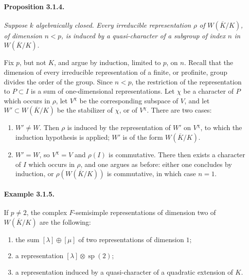 \documentclass[10pt,a4paper]{article}
\providecommand{\sprep}{\operatorname{sp}}
\begin{document}
\paragraph{Proposition 3.1.4.}{\itshape  Suppose \(k\) algebraically closed. Every irreducible representation \(\rho\) of \(W(\overline K/K)\), of dimension \(n<p\), is induced by a quasi-character of a subgroup of index \(n\) in \(W(\overline K/K)\).\par}

Fix \(p\), but not \(K\), and argue by induction, limited to \(p\), on \(n\). Recall that the dimension of every irreducible representation of a finite, or profinite, group divides the order of the group. Since \(n<p\), the restriction of the representation to \(P\subset I\) is a sum of one-dimensional representations. Let \(\chi\) be a character of \(P\) which occurs in \(\rho\), let \(V^\chi\) be the corresponding subspace of \(V\), and let \(W'\subset W(\overline K/K)\) be the stabilizer of \(\chi\), or of \(V^\chi\). There are two cases:
\begin{enumerate}[label=(\alph*)]
\item \(W'\ne W\). Then \(\rho\) is induced by the representation of \(W'\) on \(V^\chi\), to which the induction hypothesis is applied; \(W'\) is of the form \(W(\overline K/K)\).
\item \(W'=W\), so \(V^\chi=V\) and \(\rho(I)\) is commutative. There then exists a character of \(I\) which occurs in \(\rho\), and one argues as before: either one concludes by induction, or \(\rho(W(\overline K/K))\) is commutative, in which case \(n=1\).
\end{enumerate}

\paragraph{Example 3.1.5.} If \(p\ne2\), the complex \(F\)-semisimple representations of dimension two of \(W(\overline K/K)\) are the following:
\begin{enumerate}[label=(\alph*)]
\item the sum \([\lambda]\oplus[\mu]\) of two representations of dimension \(1\);
\item a representation \([\lambda]\otimes\sprep(2)\);
\item a representation induced by a quasi-character of a quadratic extension of \(K\).
\end{enumerate}

\clearpage
{}
\hypertarget{authority-41}{}
\end{document}
